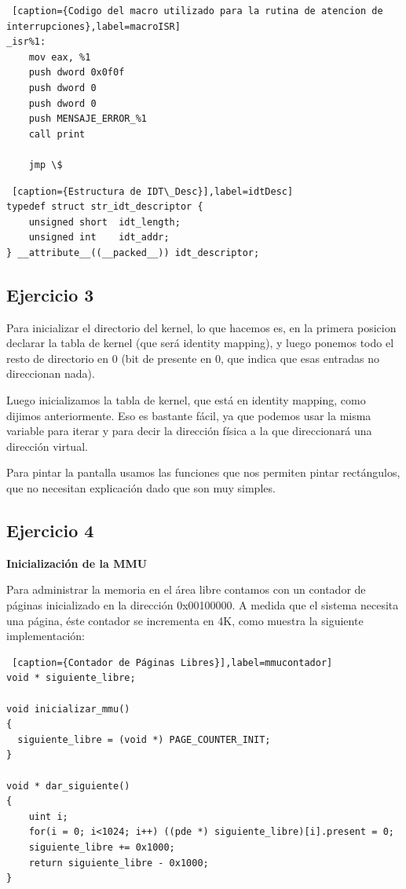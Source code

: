 \documentclass[a4paper]{article}
\begin{document}
\begin{lstlisting} [caption={Codigo del macro utilizado para la rutina de atencion de interrupciones},label=macroISR]
_isr%1:
    mov eax, %1
    push dword 0x0f0f 
    push dword 0
    push dword 0
    push MENSAJE_ERROR_%1
    call print
    
    jmp \$
\end{lstlisting}

\begin{lstlisting} [caption={Estructura de IDT\_Desc}],label=idtDesc] 
typedef struct str_idt_descriptor {
    unsigned short  idt_length;
    unsigned int    idt_addr;
} __attribute__((__packed__)) idt_descriptor;
\end{lstlisting}

\subsection{Ejercicio 3}

\par Para inicializar el directorio del kernel, lo que hacemos es, en la primera posicion declarar la tabla de kernel (que será identity mapping), y luego ponemos todo el resto de directorio en 0 (bit de presente en 0, que indica que esas entradas no direccionan nada).

\par Luego inicializamos la tabla de kernel, que está en identity mapping, como dijimos anteriormente. Eso es bastante fácil, ya que podemos usar la misma variable para iterar y para decir la dirección física a la que direccionará una dirección virtual.


\par Para pintar la pantalla usamos las funciones que nos permiten pintar rectángulos, que no necesitan explicación dado que son muy simples.

\subsection{Ejercicio 4}

\textbf{Inicialización de la MMU}

\par Para administrar la memoria en el área libre contamos con un contador de páginas inicializado en la dirección 0x00100000. A medida que el sistema necesita una página,  éste contador se incrementa en 4K, como muestra la siguiente implementación:

\begin{lstlisting} [caption={Contador de Páginas Libres}],label=mmucontador] 
void * siguiente_libre;

void inicializar_mmu()
{
  siguiente_libre = (void *) PAGE_COUNTER_INIT;
}

void * dar_siguiente()
{
    uint i;
    for(i = 0; i<1024; i++) ((pde *) siguiente_libre)[i].present = 0;
    siguiente_libre += 0x1000;
    return siguiente_libre - 0x1000;
}
\end{lstlisting}
\end{document}
